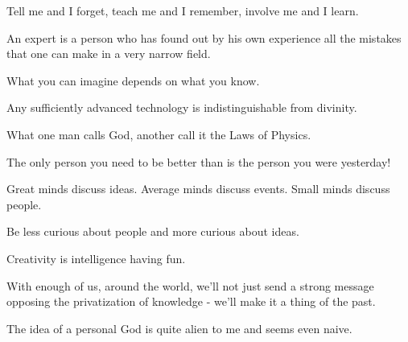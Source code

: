  	 \begin{fuquote}Tell me and I forget, teach me and I remember, involve me and I learn.
 	\end{fuquote}

 	 \begin{fuquote}An expert is a person who has found out by his own experience all the mistakes that one can make in a very narrow field.
 	\end{fuquote}
 	
 	 \begin{fuquote}What you can imagine depends on what you know.
 	\end{fuquote}
 	
 	\begin{fuquote}Any sufficiently advanced technology is indistinguishable from divinity.
 	\end{fuquote}
 	
 	\begin{fuquote}What one man calls God, another call it the Laws of Physics.
 	\end{fuquote}
 	
 	\begin{fuquote}[?]The only person you need to be better than is the person you were yesterday!
 	\end{fuquote}
 	
 	\begin{fuquote}Great minds discuss ideas. Average minds discuss events. Small minds discuss people.
 	\end{fuquote}
 	
 	\begin{fuquote}Be less curious about people and more curious about ideas.
 	\end{fuquote}
 	
 	\begin{fuquote}Creativity is intelligence having fun.
 	\end{fuquote}
 	
 	\begin{fuquote}With enough of us, around the world, we'll not just send a strong message opposing the privatization of knowledge - we'll make it a thing of the past.
 	\end{fuquote}
 	
 	\begin{fuquote}The idea of a personal God is quite alien to me and seems even naive.
 	\end{fuquote}
 	
